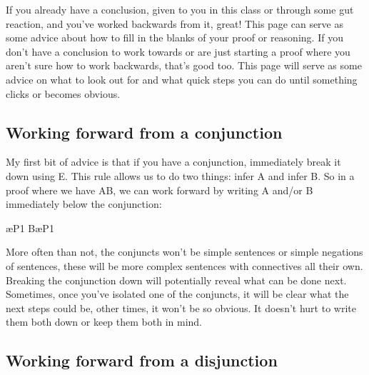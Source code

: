 If you already have a conclusion, given to you in this class or through some gut reaction, and you've worked backwards from it, great! This page can serve as some advice about how to fill in the blanks of your proof or reasoning. If you don't have a conclusion to work towards or are just starting a proof where you aren't sure how to work backwards, that's good too. This page will serve as some advice on what to look out for and what quick steps you can do until something clicks or becomes obvious.

\subsection{Working forward from a conjunction}

My first bit of advice is that if you have a conjunction, immediately break it down using \eand E. This rule allows us to do two things: infer A and infer B. So in a proof where we have A\eand B, we can work forward by writing A and/or B immediately below the conjunction:
\begin{fitchproof}
\ae{P1}
B\ae{P1}	
\end{fitchproof}

More often than not, the conjuncts won't be simple sentences or simple negations of sentences, these will be more complex sentences with connectives all their own. Breaking the conjunction down will potentially reveal what can be done next. Sometimes, once you've isolated one of the conjuncts, it will be clear what the next steps could be, other times, it won't be so obvious. It doesn't hurt to write them both down or keep them both in mind.

\subsection{Working forward from a disjunction}


